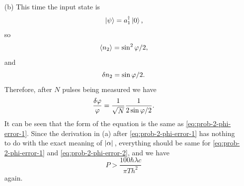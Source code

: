 \documentclass[hyperref, a4paper]{article}
\begin{document}
\begin{itemize}
\item[(b)] This time the input state is 
\begin{equation}
    \ket*{\psi} = a_1^\dagger \ket*{0},
\end{equation} 
so 
\begin{equation}
    \expval*{n_2} = \sin^2 \varphi / 2,
\end{equation}
and 
\begin{equation}
    \var{n_2} = \sin \varphi / 2.
\end{equation}
Therefore, after $N$ pulses being measured we have 
\begin{equation}
    \frac{\var{\varphi}}{\varphi} = \frac{1}{\sqrt{N}} \frac{1}{2 \sin \varphi / 2}.
    \label{eq:prob-2-phi-error-2}
\end{equation}
It can be seen that the form of the equation is the same as \eqref{eq:prob-2-phi-error-1}. 
Since the derivation in (a) after \eqref{eq:prob-2-phi-error-1} has nothing to do with the exact meaning of $\abs*{\alpha}$,
everything should be same for \eqref{eq:prob-2-phi-error-1} and \eqref{eq:prob-2-phi-error-2}, and we have 
\begin{equation}
    P > \frac{100 \hbar \lambda c}{\pi T h^2}
\end{equation}
again. 


\end{itemize}
\end{document}
